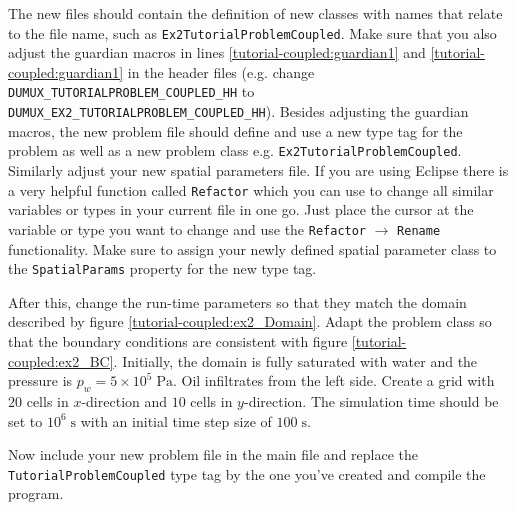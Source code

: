 The new files should contain the definition of new classes with names
that relate to the file name, such as
\texttt{Ex2TutorialProblemCoupled}. Make sure that you also adjust the
guardian macros in lines \ref{tutorial-coupled:guardian1} and
\ref{tutorial-coupled:guardian1}
in the header files (e.g. change
\mbox{\texttt{DUMUX\_TUTORIALPROBLEM\_COUPLED\_HH}} to\\
\mbox{\texttt{DUMUX\_EX2\_TUTORIALPROBLEM\_COUPLED\_HH}}). 
Besides adjusting the guardian macros, the new problem file should define and
use a new type tag for the problem as well as a new problem class
e.g. \mbox{\texttt{Ex2TutorialProblemCoupled}}. Similarly adjust your new spatial parameters file. If you are using Eclipse there is 
a very helpful function called \texttt{Refactor} which you can use to change
all similar variables or types in your current file in one go. Just place the cursor at the variable or type you want to change
and use the \texttt{Refactor} $\rightarrow$ \texttt{Rename} functionality. Make sure to assign your
newly defined spatial parameter class to the
\texttt{SpatialParams} property for the new
type tag. 

After this, change the run-time parameters so that they match the
domain described by figure \ref{tutorial-coupled:ex2_Domain}. Adapt
the problem class so that the boundary conditions are consistent with
figure \ref{tutorial-coupled:ex2_BC}. Initially, the domain is fully
saturated with water and the pressure is $p_w = 5 \times
10^5\;\text{Pa}$.  Oil infiltrates from the left side. Create a grid
with $20$ cells in $x$-direction and $10$ cells in $y$-direction. The
simulation time should be set to $10^6\;\text{s}$ with an
initial time step size of $100\;\text{s}$.

Now include your new problem file in the main file and replace the
\texttt{TutorialProblemCoupled} type tag by the one you've created and
compile the program.


